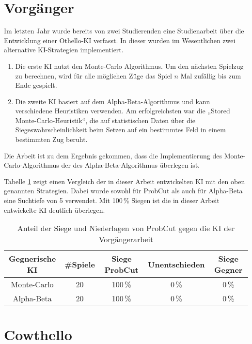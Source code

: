 
\section{Vorgänger}
Im letzten Jahr wurde bereits von zwei Studierenden eine Studienarbeit über die Entwicklung einer Othello-KI verfasst.
In dieser wurden im Wesentlichen zwei alternative KI-Strategien implementiert.
\begin{enumerate}
    \item Die erste KI nutzt den Monte-Carlo Algorithmus. Um den nächsten Spielzug zu berechnen, wird für alle möglichen
    Züge das Spiel $n$ Mal zufällig bis zum Ende gespielt.
    \cite[S.~19]{othellostudienarbeit}
    \item Die zweite KI basiert auf dem Alpha-Beta-Algorithmus und kann verschiedene Heuristiken verwenden. Am
    erfolgreichsten war die „Stored Monte-Carlo-Heuristik“, die auf statistischen Daten über die
    Siegeswahrscheinlichkeit beim Setzen auf ein bestimmtes Feld in einem bestimmten Zug beruht.
    \cite[S.~30]{othellostudienarbeit}
\end{enumerate}
Die Arbeit ist zu dem Ergebnis gekommen, dass die Implementierung des Monte-Carlo-Algorithmus der des
Alpha-Beta-Algorithmus überlegen ist.
\cite[S.~55]{othellostudienarbeit}

Tabelle \ref{table:comp:previous} zeigt einen Vergleich der in dieser Arbeit entwickelten KI mit den oben genannten
Strategien. Dabei wurde sowohl für ProbCut als auch für Alpha-Beta eine Suchtiefe von 5 verwendet. Mit 100\,\% Siegen
ist die in dieser Arbeit entwickelte KI deutlich überlegen.

\begin{table}[H]
\centering
\begin{tabular}{c|c|ccc}
\hline
Gegnerische KI & \#Spiele & Siege ProbCut & Unentschieden & Siege Gegner \\
\hline
Monte-Carlo & 20 & 100\,\% & 0\,\% & 0\,\% \\
Alpha-Beta  & 20 & 100\,\% & 0\,\% & 0\,\% \\
\hline
\end{tabular}
\caption{Anteil der Siege und Niederlagen von ProbCut gegen die KI der Vorgängerarbeit}
\label{table:comp:previous}
\end{table}

\section{Cowthello}


